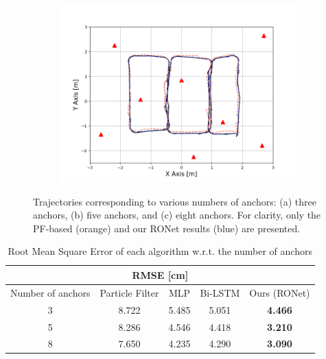 \documentclass[letterpaper, 10 pt, conference]{ieeeconf}
\begin{document}
\begin{figure}[h]
\begin{subfigure}[b]{0.32\textwidth}
		\caption{}
		\label{fig:anchor_5}
	\end{subfigure}
	\begin{subfigure}[b]{0.32\textwidth}
		\includegraphics[width=\textwidth]{image/trajectory_8}
		\caption{}
		\label{fig:anchor_8}
	\end{subfigure}
	\caption{Trajectories corresponding to various numbers of anchors: (a) three anchors, (b) five anchors, and (c) eight anchors. For clarity, only the PF-based (orange) and our RONet results (blue) are presented.}\label{fig:trajectories_358}
\end{figure}

\begin{table}[h]
	\centering
	\caption{Root Mean Square Error of each algorithm w.r.t. the number of anchors}
	\begin{tabular}{ccccc}
		\toprule
		\multicolumn{5}{c}{RMSE {[}cm{]}}   \\ \midrule
		Number of anchors & Particle Filter\cite{gonzalez2009mobile} & MLP\cite{kumar2016localization} & Bi-LSTM\cite{lim2018effective} & Ours (RONet) \\ \cmidrule{2-5} 
		3             & 8.722 & 5.485 & 5.051 & \textbf{4.466} \\
		5             & 8.286 & 4.546 & 4.418 & \textbf{3.210} \\
		8             & 7.650 & 4.235 & 4.290 & \textbf{3.090} \\ \bottomrule
	\end{tabular}
	\label{table:rmse}
\end{table}
\end{document}
